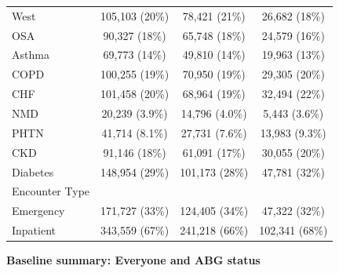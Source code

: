 \documentclass[
  11pt,
  letterpaper,
  DIV=11,
  numbers=noendperiod]{scrartcl}
\begin{document}
\begin{longtable*}{>{\raggedright\arraybackslash}p{2.0in}ccc}
West & 105,103 (20\%) & 78,421 (21\%) & 26,682 (18\%)\\
OSA & 90,327 (18\%) & 65,748 (18\%) & 24,579 (16\%)\\
Asthma & 69,773 (14\%) & 49,810 (14\%) & 19,963 (13\%)\\
\addlinespace
COPD & 100,255 (19\%) & 70,950 (19\%) & 29,305 (20\%)\\
CHF & 101,458 (20\%) & 68,964 (19\%) & 32,494 (22\%)\\
NMD & 20,239 (3.9\%) & 14,796 (4.0\%) & 5,443 (3.6\%)\\
PHTN & 41,714 (8.1\%) & 27,731 (7.6\%) & 13,983 (9.3\%)\\
CKD & 91,146 (18\%) & 61,091 (17\%) & 30,055 (20\%)\\
\addlinespace
Diabetes & 148,954 (29\%) & 101,173 (28\%) & 47,781 (32\%)\\
Encounter Type &  &  & \\
Emergency & 171,727 (33\%) & 124,405 (34\%) & 47,322 (32\%)\\
Inpatient & 343,559 (67\%) & 241,218 (66\%) & 102,341 (68\%)\\*
\end{longtable*}
\endgroup{}

\FloatBarrier\nopagebreak

\par

\noindent

\begin{center}\textbf{Baseline summary: Everyone and ABG status}\end{center}

\begingroup\fontsize{7}{9}\selectfont
\end{document}
